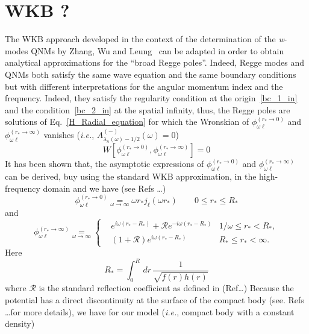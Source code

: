 \documentclass[aps,prd,longbibliography,reprint,twocolumn,amsmath,amssymb,amsfonts,showpacs,superscriptaddress]{revtex4-1}%
\begin{document}
\section{WKB ?}
\label{SecIII}

The WKB approach developed in the context of the determination of the \textit{w}-modes QNMs by Zhang, Wu and Leung~\cite{Zhang:2011pq} can be adapted in order to obtain analytical approximations for the ``broad Regge poles''. Indeed, Regge modes and QNMs both satisfy the same wave equation and the same boundary conditions but with different interpretations for the angular momentum index and the frequency. Indeed, they satisfy the regularity condition at the origin~\eqref{bc_1_in} and the condition~\eqref{bc_2_in} at the spatial infinity, thus, the Regge poles are solutions of Eq.~\eqref{H_Radial_equation} for which the  Wronskian of $\phi^{(r_*\to 0)}_{\omega\ell}$ and $\phi^{(r_*\to \infty)}_{\omega\ell}$ vanishes (\textit{i.e.}, $A^{(-)}_{\lambda_n(\omega)-1/2} (\omega)=0$)
\begin{equation}\label{Wronskian}
  W[\phi^{(r_*\to 0)}_{\omega\ell},\phi^{(r_*\to \infty)}_{\omega\ell}]= 0
\end{equation}
It has been shown that, the asymptotic expressions of $\phi^{(r_*\to 0)}_{\omega\ell}$ and $\phi^{(r_*\to \infty)}_{\omega\ell}$ can be derived, buy using the standard WKB approximation, in the high-frequency domain and we have (see Refs \ldots)
\begin{equation}\label{Approx_origin}
  \phi^{(r_* \to 0)}_{\omega\ell} \underset{\omega \to \infty}{=} \omega r_* j_\ell(\omega r_*) \quad\quad 0\leq r_*\leq R_*
\end{equation}
and
\begin{equation}
\label{Approx_infinity}
\phi^{(r_* \to \infty)}_{\omega\ell}\scriptstyle{\underset{\omega \to \infty}{=}}
\left\{
\begin{aligned}
&e^{i\omega(r_*-R_*)}+\mathcal{R} e^{-i\omega (r_*-R_*)}& \scriptstyle{1/\omega\leq r_{*} < R_*,}\\
&\left(1+\mathcal{R}\right) e^{i\omega(r_*-R_*)}        & \scriptstyle{R_*\leq r_{*}<\infty.}
\end{aligned}
\right.
\end{equation}
Here
\begin{equation}\label{R_star}
  R_*=\int_{0}^{R}\, dr\,\frac{1}{\sqrt{f(r)h(r)}}
\end{equation}
where $\mathcal{R}$ is the standard reflection coefficient as defined in (Ref\ldots)
Because the potential has a direct discontinuity at the surface of the compact body (see. Refs \ldots for more details), we have for our model (\textit{i.e.}, compact body with a constant density)
\end{document}
